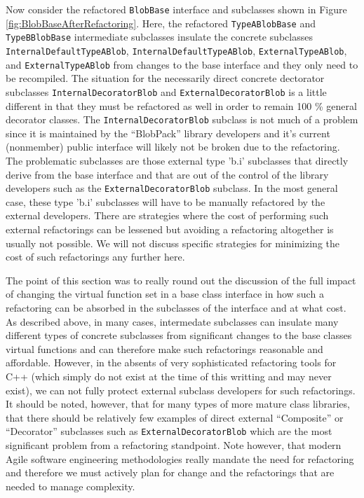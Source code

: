 \documentclass[pdf,ps2pdf,11pt]{SANDreport}
\begin{document}
Now consider the refactored {}\texttt{Blob\-Base} interface and subclasses
shown in Figure {}\ref{fig:BlobBaseAfterRefactoring}.  Here, the refactored
{}\texttt{Type\-A\-Blob\-Base} and {}\texttt{Type\-B\-Blob\-Base} intermediate
subclasses insulate the concrete subclasses
{}\texttt{Internal\-Default\-Type\-A\-Blob},
{}\texttt{Internal\-Default\-Type\-A\-Blob},
{}\texttt{External\-Type\-A\-Blob}, and {}\texttt{External\-Type\-A\-Blob}
from changes to the base interface and they only need to be recompiled.  The
situation for the necessarily direct concrete dectorator subclasses
{}\texttt{Internal\-Decorator\-Blob} and {}\texttt{External\-Decorator\-Blob}
is a little different in that they must be refactored as well in order to
remain 100 \% general decorator classes.  The
{}\texttt{Internal\-Decorator\-Blob} subclass is not much of a problem since
it is maintained by the ``BlobPack'' library developers and it's current
(nonmember) public interface will likely not be broken due to the refactoring.
The problematic subclasses are those external type 'b.i' subclasses that
directly derive from the base interface and that are out of the control of the
library developers such as the {}\texttt{External\-Decorator\-Blob} subclass.
In the most general case, these type 'b.i' subclasses will have to be manually
refactored by the external developers.  There are strategies where the cost of
performing such external refactorings can be lessened but avoiding a
refactoring altogether is usually not possible.  We will not discuss specific
strategies for minimizing the cost of such refactorings any further here.

The point of this section was to really round out the discussion of the full
impact of changing the virtual function set in a base class interface in how
such a refactoring can be absorbed in the subclasses of the interface and at
what cost.  As described above, in many cases, intermedate subclasses can
insulate many different types of concrete subclasses from significant changes
to the base classes virtual functions and can therefore make such refactorings
reasonable and affordable.  However, in the absents of very sophisticated
refactoring tools for C++ (which simply do not exist at the time of this
writting and may never exist), we can not fully protect external subclass
developers for such refactorings.  It should be noted, however, that for many
types of more mature class libraries, that there should be relatively few
examples of direct external ``Composite'' or ``Decorator'' subclasses such as
{}\texttt{External\-Decorator\-Blob} which are the most significant problem
from a refactoring standpoint.  Note however, that modern Agile software
engineering methodologies really mandate the need for refactoring and
therefore we must actively plan for change and the refactorings that are
needed to manage complexity.
\end{document}
